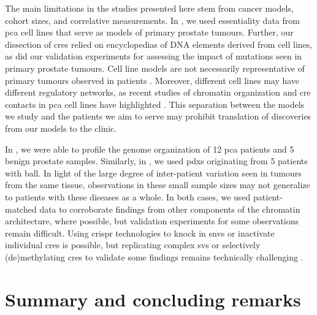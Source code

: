 The main limitations in the studies presented here stem from cancer models, cohort sizes, and correlative measurements.
In , we used essentiality data from \gls{pca} cell lines that serve as models of primary prostate tumours.
Further, our dissection of \glspl{cre} relied on encyclopedias of DNA elements derived from cell lines, as did our validation experiments for assessing the impact of mutations seen in primary prostate tumours.
Cell line models are not necessarily representative of primary tumours observed in patients \cite{}.
Moreover, different cell lines may have different regulatory networks, as recent studies of chromatin organization and \gls{cre} contacts in \gls{pca} cell lines have highlighted \cite{ahmedCRISPRiScreensReveal2021}.
This separation between the models we study and the patients we aim to serve may prohibit translation of discoveries from our models to the clinic.

In , we were able to profile the genome organization of 12 \gls{pca} patients and 5 benign prostate samples.
Similarly, in , we used \glspl{pdx} originating from 5 patients with \gls{ball}.
In light of the large degree of inter-patient variation seen in tumours from the same tissue, observations in these small sample sizes may not generalize to patients with these diseases as a whole.
In both cases, we used patient-matched data to corroborate findings from other components of the chromatin architecture, where possible, but validation experiments for some observations remain difficult.
Using \gls{crispr} technologies to knock in \glspl{snv} or inactivate individual \glspl{cre} is possible, but replicating complex \glspl{sv} or selectively (de)methylating \glspl{cre} to validate some findings remains technically challenging \cite{nakamuraCRISPRTechnologiesPrecise2021,pickar-oliverNextGenerationCRISPR2019,wangEngineering3DGenome2021}.

\section{Summary and concluding remarks}

